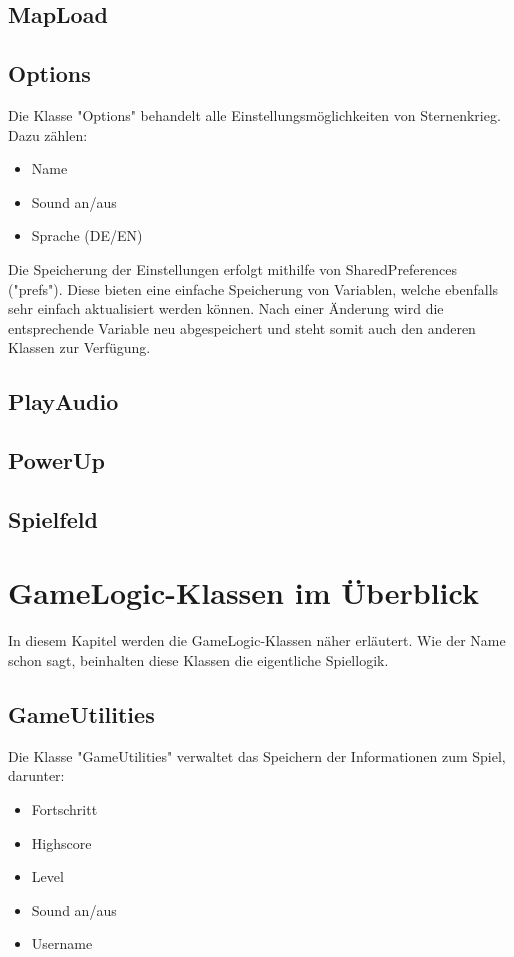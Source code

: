 \documentclass[11pt]{article} %
\begin{document}
\subsection{MapLoad}

\subsection{Options}
Die Klasse "Options" behandelt alle Einstellungsmöglichkeiten von Sternenkrieg. Dazu zählen:
\begin{itemize}
\item Name
\item Sound an/aus
\item Sprache (DE/EN)
\end{itemize}
Die Speicherung der Einstellungen erfolgt mithilfe von SharedPreferences ("prefs"). Diese bieten eine einfache Speicherung von Variablen, welche ebenfalls sehr einfach aktualisiert werden können. Nach einer Änderung wird die entsprechende Variable neu abgespeichert und steht somit auch den anderen Klassen zur Verfügung.

\subsection{PlayAudio}

\subsection{PowerUp}

\subsection{Spielfeld}

\section{GameLogic-Klassen im Überblick}
In diesem Kapitel werden die GameLogic-Klassen näher erläutert. Wie der Name schon sagt, beinhalten diese Klassen die eigentliche Spiellogik.

\subsection{GameUtilities}
Die Klasse "GameUtilities" verwaltet das Speichern der Informationen zum Spiel, darunter:
\begin{itemize}
\item Fortschritt
\item Highscore
\item Level
\item Sound an/aus
\item Username
\end{itemize}
\end{document}
